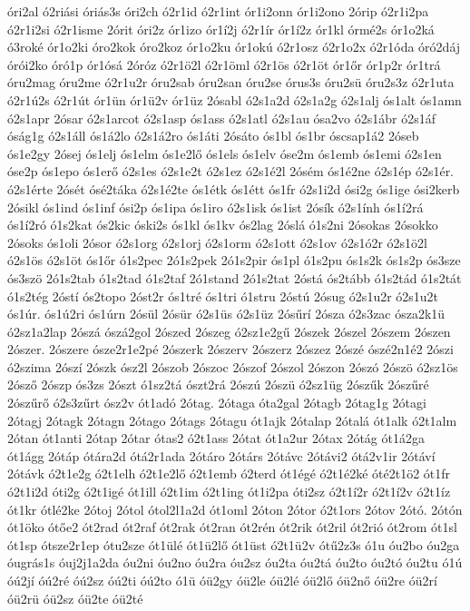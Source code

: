 {óri2al
ó2riási
óriás3s
óri2ch
ó2r1id
ó2r1int
ór1i2onn
ór1i2ono
2órip
ó2r1i2pa
ó2r1i2si
ó2r1isme
2órit
óri2z
ór1izo
ór1í2j
ó2r1ír
ór1í2z
ór1kl
órmé2s
ór1o2ká
ó3roké
ór1o2ki
óro2kok
óro2koz
ór1o2ku
ór1okú
ó2r1osz
ó2r1o2x
ó2r1óda
óró2dáj
órói2ko
óró1p
ór1ósá
2óróz
ó2r1ö2l
ó2r1öml
ó2r1ös
ó2r1öt
ór1őr
ór1p2r
ór1trá
óru2mag
óru2me
ó2r1u2r
óru2sab
óru2san
óru2se
órus3s
óru2sü
óru2s3z
ó2r1uta
ó2r1ú2s
ó2r1út
ór1ün
ór1ü2v
ór1üz
2ósabl
ó2s1a2d
ó2s1a2g
ó2s1alj
ós1alt
ós1amn
ó2s1apr
2ósar
ó2s1arcot
ó2s1asp
ós1ass
ó2s1atl
ó2s1au
ósa2vo
ó2s1ábr
ó2s1áf
óság1g
ó2s1áll
ós1á2lo
ó2s1á2ro
ós1áti
2ósáto
ós1bl
ós1br
óscsap1á2
2óseb
ós1e2gy
2ósej
ós1elj
ós1elm
ós1e2lő
ós1els
ós1elv
óse2m
ós1emb
ós1emi
ó2s1en
óse2p
ós1epo
ós1erő
ó2s1es
ó2s1e2t
ó2s1ez
ó2s1é2l
2ósém
ós1é2ne
ó2s1ép
ó2s1ér.
ó2s1érte
2ósét
ósé2táka
ó2s1é2te
ós1étk
ós1étt
ós1fr
ó2s1i2d
ósi2g
ós1ige
ósi2kerb
2ósikl
ós1ind
ós1inf
ósi2p
ós1ipa
ós1iro
ó2s1isk
ós1ist
2ósík
ó2s1ính
ós1í2rá
ós1í2ró
ó1s2kat
ós2kic
óski2s
ós1kl
ós1kv
ós2lag
2óslá
ó1s2ni
2ósokas
2ósokko
2ósoks
ós1oli
2ósor
ó2s1org
ó2s1orj
ó2s1orm
ó2s1ott
ó2s1ov
ó2s1ó2r
ó2s1ö2l
ó2s1ös
ó2s1öt
ós1őr
ó1s2pec
2ó1s2pek
2ó1s2pir
ós1pl
ó1s2pu
ós1s2k
ós1s2p
ós3sze
ós3szö
2ó1s2tab
ó1s2tad
ó1s2taf
2ó1stand
2ó1s2tat
2óstá
ós2tább
ó1s2tád
ó1s2tát
ó1s2tég
2óstí
ós2topo
2óst2r
ós1tré
ós1tri
ó1stru
2óstú
2ósug
ó2s1u2r
ó2s1u2t
ós1úr.
ós1ú2ri
ós1úrn
2ósül
2ósür
ó2s1üs
ó2s1üz
2ósűrí
2ósza
ó2s3zac
ósza2k1ü
ó2sz1a2lap
2ószá
ószá2gol
2ószed
2ószeg
ó2sz1e2gű
2ószek
2ószel
2ószem
2ószen
2ószer.
2ószere
ósze2r1e2pé
2ószerk
2ószerv
2ószerz
2ószez
2ószé
ószé2n1é2
2ószi
ó2szima
2ószí
2ószk
ósz2l
2ószob
2ószoc
2ószof
2ószol
2ószon
2ószó
2ószö
ó2sz1ös
2ósző
2ószp
ós3zs
2ószt
ó1sz2tá
ószt2rá
2ószú
2ószü
ó2sz1üg
2ószűk
2ószűré
2ószűrő
ó2s3zűrt
ósz2v
ót1adó
2ótag.
2ótaga
óta2gal
2ótagb
2ótag1g
2ótagi
2ótagj
2ótagk
2ótagn
2ótago
2ótags
2ótagu
ót1ajk
2ótalap
2ótalá
ót1alk
ó2t1alm
2ótan
ót1anti
2ótap
2ótar
ótas2
ó2t1ass
2ótat
ót1a2ur
2ótax
2ótág
ót1á2ga
ót1ágg
2ótáp
ótára2d
ótá2r1ada
2ótáro
2ótárs
2ótávc
2ótávi2
ótá2v1ir
2ótáví
2ótávk
ó2t1e2g
ó2t1elh
ó2t1e2lő
ó2t1emb
ó2terd
ót1égé
ó2t1é2ké
óté2t1ö2
ót1fr
ó2t1i2d
óti2g
ó2t1igé
ót1ill
ó2t1im
ó2t1ing
ót1i2pa
óti2sz
ó2t1í2r
ó2t1í2v
ó2t1íz
ót1kr
ótlé2ke
2ótoj
2ótol
ótol2l1a2d
ót1oml
2óton
2ótor
ó2t1ors
2ótov
2ótó.
2ótón
ót1öko
ótőe2
ót2rad
ót2raf
ót2rak
ót2ran
ót2rén
ót2rik
ót2ril
ót2rió
ót2rom
ót1sl
ót1sp
ótsze2r1ep
ótu2sze
ót1ülé
ót1ü2lő
ót1üst
ó2t1ü2v
ótű2z3s
ó1u
óu2bo
óu2ga
óugrás1s
óuj2j1a2da
óu2ni
óu2no
óu2ra
óu2sz
óu2ta
óu2tá
óu2to
óu2tó
óu2tu
ó1ú
óú2jí
óú2ré
óú2sz
óú2ti
óú2to
ó1ü
óü2gy
óü2le
óü2lé
óü2lő
óü2nő
óü2re
óü2rí
óü2rü
óü2sz
óü2te
óü2té
}
